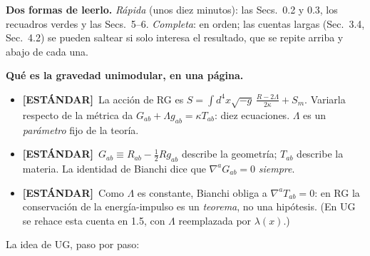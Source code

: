 \documentclass[11pt,a4paper]{article}
\newcommand{\estandar}{{\bfseries\color{BurntOrange}[ESTÁNDAR]}}
\newcommand{\sub}[2]{\par\medskip\noindent{\bfseries\color{NavyBlue}#1}\quad\textbf{#2}}
\begin{document}
\textbf{Dos formas de leerlo.} \emph{Rápida} (unos diez minutos): las Secs.~0.2 y 0.3, los recuadros verdes y las Secs.~5--6. \emph{Completa}: en orden; las cuentas largas (Sec.~3.4, Sec.~4.2) se pueden saltear si solo interesa el resultado, que se repite arriba y abajo de cada una.

\sub{0.2}{Qué es la gravedad unimodular, en una página.}

\begin{repaso}
\begin{itemize}[nosep]
\item \estandar\ La acción de RG es $S=\int d^4x\sqrt{-g}\,\frac{R-2\Lambda}{2\kappa}+S_m$. Variarla respecto de la métrica da $G_{ab}+\Lambda g_{ab}=\kappa T_{ab}$: diez ecuaciones. $\Lambda$ es un \emph{parámetro} fijo de la teoría.
\item \estandar\ $G_{ab}\equiv R_{ab}-\tfrac12Rg_{ab}$ describe la geometría; $T_{ab}$ describe la materia. La identidad de Bianchi dice que $\nabla^aG_{ab}=0$ \emph{siempre}.
\item \estandar\ Como $\Lambda$ es constante, Bianchi obliga a $\nabla^aT_{ab}=0$: en RG la conservación de la energía-impulso es un \emph{teorema}, no una hipótesis. (En UG se rehace esta cuenta en 1.5, con $\Lambda$ reemplazada por $\lambda(x)$.)
\end{itemize}
\end{repaso}

La idea de UG, paso por paso:
\end{document}
